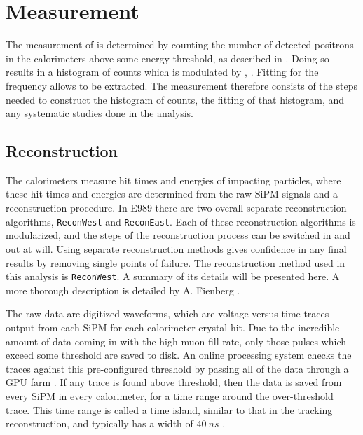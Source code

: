 
\thispagestyle{myheadings}

\graphicspath{{Body/Figures/WaGeneral/}{Body/Figures/RatioAnalysis/}{Body/Figures/RatioAnalysis/MethodOverview/}}

\chapter{\texorpdfstring{\wa}{wa} Measurement}
\label{chapter:SpinPrecessionMeasurement}


The measurement of \wa is determined by counting the number of detected positrons in the calorimeters above some energy threshold, as described in . Doing so results in a histogram of counts which is modulated by \wa, . Fitting for the frequency allows \wa to be extracted. The \wa measurement therefore consists of the steps needed to construct the histogram of counts, the fitting of that histogram, and any systematic studies done in the analysis.


\section{Reconstruction}
\label{sec:ReconWest}


The calorimeters measure hit times and energies of impacting particles, where these hit times and energies are determined from the raw SiPM signals and a reconstruction procedure. In E989 there are two overall separate reconstruction algorithms, \texttt{ReconWest} and \texttt{ReconEast}. Each of these reconstruction algorithms is modularized, and the steps of the reconstruction process can be switched in and out at will. Using separate reconstruction methods gives confidence in any final results by removing single points of failure. The reconstruction method used in this analysis is \texttt{ReconWest}. A summary of its details will be presented here. A more thorough description is detailed by A. Fienberg \cite{AFThesis}.


The raw data are digitized waveforms, which are voltage versus time traces output from each SiPM for each calorimeter crystal hit. Due to the incredible amount of data coming in with the high muon fill rate, only those pulses which exceed some threshold are saved to disk. An online processing system checks the traces against this pre-configured threshold by passing all of the data through a GPU farm \cite{Gohn:2016shi}. If any trace is found above threshold, then the data is saved from every SiPM in every calorimeter, for a time range around the over-threshold trace. This time range is called a time island, similar to that in the tracking reconstruction, and typically has a width of $\SI{40}{ns}$ \cite{AFThesis}.


